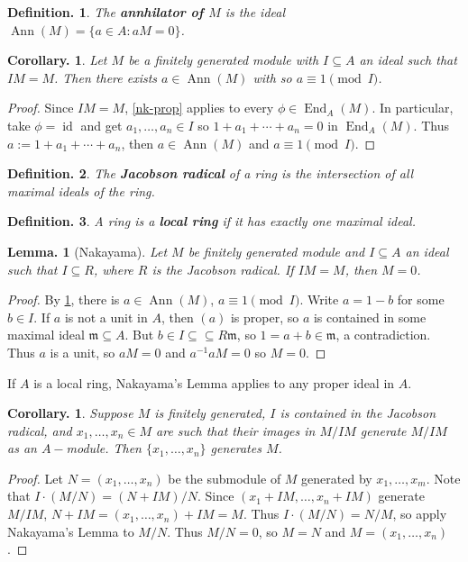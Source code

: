 \documentclass[11pt, a4paper]{memoir}
\theoremstyle{change}
\newtheorem{lemma}[theorem]{Lemma.}
\newtheorem{corollary}[theorem]{Corollary.}
\theoremstyle{plain}
\theoremstyle{nonumberplain}
\newtheorem{definition}{Definition.}
\newtheorem{proof}{Proof}
\DeclareMathOperator{\Ann}{Ann}
\DeclareMathOperator{\End}{End}
\DeclareMathOperator{\id}{id}
\numberwithin{equation}{section}
\begin{document}
\begin{definition}
    The \textbf{annhilator of $M$} is the ideal $\Ann(M)=\{a\in A:aM=0\}$.
\end{definition}
\begin{corollary}\label{fg-ann}
    Let $M$ be a finitely generated module with $I\subseteq A$ an ideal such that $IM=M$.
    Then there exists $a\in \Ann(M)$ with so $a\equiv 1\pmod{I}$.
\end{corollary}
\begin{proof}
    Since $IM=M$, \cref{nk-prop} applies to every $\phi\in\End_A(M)$.
    In particular, take $\phi=\id$ and get $a_1,\ldots,a_n\in I$ so $1+a_1+\cdots+a_n=0$ in $\End_A(M)$.
    Thus $a:=1+a_1+\cdots+a_n$, then $a\in\Ann(M)$ and $a\equiv 1\pmod{I}$.
\end{proof}
\begin{definition}
    The \textbf{Jacobson radical} of a ring is the intersection of all maximal ideals of the ring.
\end{definition}
\begin{definition}
    A ring is a \textbf{local ring} if it has exactly one maximal ideal.
\end{definition}
\begin{lemma}[Nakayama]
    Let $M$ be finitely generated module and $I\subseteq A$ an ideal such that $I\subseteq R$, where $R$ is the Jacobson radical.
    If $IM=M$, then $M=0$.
\end{lemma}
\begin{proof}
    By \cref{fg-ann}, there is $a\in\Ann(M)$, $a\equiv 1\pmod{I}$.
    Write $a=1-b$ for some $b\in I$.
    If $a$ is not a unit in $A$, then $(a)$ is proper, so $a$ is contained in some maximal ideal $\mathfrak{m}\subseteq A$.
    But $b\in I\subseteq \subseteq R\mathfrak{m}$, so $1=a+b\in \mathfrak{m}$, a contradiction.
    Thus $a$ is a unit, so $aM=0$ and $a^{-1}aM=0$ so $M=0$.
\end{proof}
If $A$ is a local ring, Nakayama's Lemma applies to any proper ideal in $A$.
\begin{corollary}
    Suppose $M$ is finitely generated, $I$ is contained in the Jacobson radical, and $x_1,\ldots,x_n\in M$ are such that their images in $M/IM$ generate $M/IM$ as an $A-$module.
    Then $\{x_1,\ldots,x_n\}$ generates $M$.
\end{corollary}
\begin{proof}
    Let $N=(x_1,\ldots,x_n)$ be the submodule of $M$ generated by $x_1,\ldots,x_m$.
    Note that $I\cdot(M/N)=(N+IM)/N$.
    Since $(x_1+IM,\ldots,x_n+IM)$ generate $M/IM$, $N+IM=(x_1,\ldots,x_n)+IM=M$.
    Thus $I\cdot(M/N)=N/M$, so apply Nakayama's Lemma to $M/N$.
    Thus $M/N=0$, so $M=N$ and $M=(x_1,\ldots,x_n)$.
\end{proof}
\end{document}
